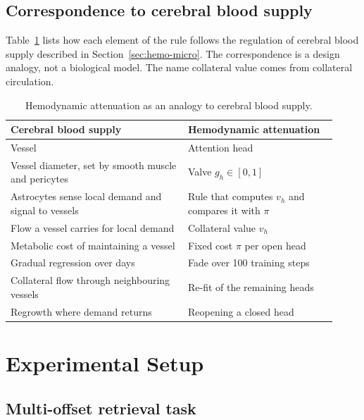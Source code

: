 \subsection{Correspondence to cerebral blood supply}
\label{sec:ha-analogy}

Table~\ref{tab:analogy} lists how each element of the rule follows the regulation of cerebral blood supply described in Section~\ref{sec:hemo-micro}. The correspondence is a design analogy, not a biological model. The name collateral value comes from collateral circulation.

\begin{table}[hbt]
  \centering
  \small
  \caption{Hemodynamic attenuation as an analogy to cerebral blood supply.}
  \label{tab:analogy}
  \begin{tabular}{@{}p{0.50\linewidth}p{0.42\linewidth}@{}}
    \toprule
    Cerebral blood supply & Hemodynamic attenuation \\
    \midrule
    Vessel & Attention head \\
    Vessel diameter, set by smooth muscle and pericytes & Valve $g_h \in [0,1]$ \\
    Astrocytes sense local demand and signal to vessels & Rule that computes $v_h$ and compares it with $\pi$ \\
    Flow a vessel carries for local demand & Collateral value $v_h$ \\
    Metabolic cost of maintaining a vessel & Fixed cost $\pi$ per open head \\
    Gradual regression over days & Fade over 100 training steps \\
    Collateral flow through neighbouring vessels & Re-fit of the remaining heads \\
    Regrowth where demand returns & Reopening a closed head \\
    \bottomrule
  \end{tabular}
\end{table}

\section{Experimental Setup}
\label{sec:ha-setup}

\subsection{Multi-offset retrieval task}

